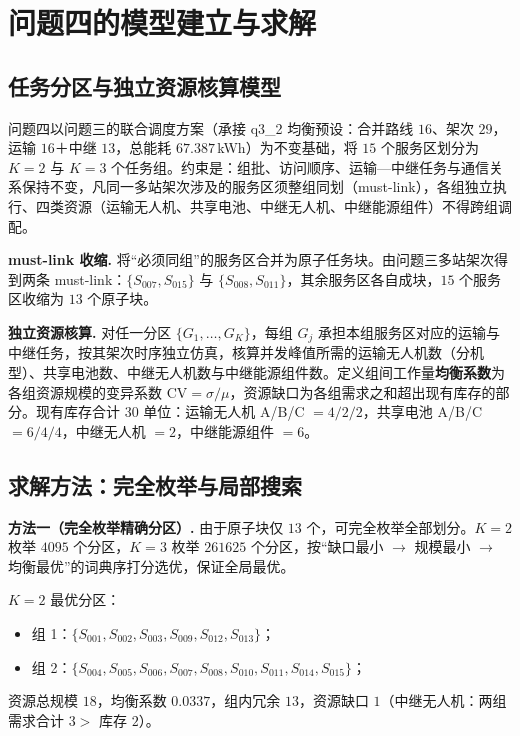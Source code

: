 \section{问题四的模型建立与求解}

\subsection{任务分区与独立资源核算模型}

问题四以问题三的联合调度方案（承接 q3\_2 均衡预设：合并路线 $16$、架次 $29$，运输 $16$＋中继 $13$，总能耗 $67.387\,$kWh）为不变基础，将 $15$ 个服务区划分为 $K=2$ 与 $K=3$ 个任务组。约束是：组批、访问顺序、运输—中继任务与通信关系保持不变，凡同一多站架次涉及的服务区须整组同划（must-link），各组独立执行、四类资源（运输无人机、共享电池、中继无人机、中继能源组件）不得跨组调配。

\textbf{must-link 收缩.} 将“必须同组”的服务区合并为原子任务块。由问题三多站架次得到两条 must-link：$\{S_{007},S_{015}\}$ 与 $\{S_{008},S_{011}\}$，其余服务区各自成块，$15$ 个服务区收缩为 $13$ 个原子块。

\textbf{独立资源核算.} 对任一分区 $\{G_1,\dots,G_K\}$，每组 $G_j$ 承担本组服务区对应的运输与中继任务，按其架次时序独立仿真，核算并发峰值所需的运输无人机数（分机型）、共享电池数、中继无人机数与中继能源组件数。定义组间工作量\textbf{均衡系数}为各组资源规模的变异系数 $\mathrm{CV}=\sigma/\mu$，资源缺口为各组需求之和超出现有库存的部分。现有库存合计 $30$ 单位：运输无人机 A/B/C $=4/2/2$，共享电池 A/B/C $=6/4/4$，中继无人机 $=2$，中继能源组件 $=6$。

\subsection{求解方法：完全枚举与局部搜索}

\textbf{方法一（完全枚举精确分区）.} 由于原子块仅 $13$ 个，可完全枚举全部划分。$K=2$ 枚举 $4095$ 个分区，$K=3$ 枚举 $261625$ 个分区，按“缺口最小 $\to$ 规模最小 $\to$ 均衡最优”的词典序打分选优，保证全局最优。

$K=2$ 最优分区：
\begin{itemize}[leftmargin=2em]
  \item 组 1：$\{S_{001},S_{002},S_{003},S_{009},S_{012},S_{013}\}$；
  \item 组 2：$\{S_{004},S_{005},S_{006},S_{007},S_{008},S_{010},S_{011},S_{014},S_{015}\}$；
\end{itemize}
资源总规模 $18$，均衡系数 $0.0337$，组内冗余 $13$，资源缺口 $1$（中继无人机：两组需求合计 $3>$ 库存 $2$）。

